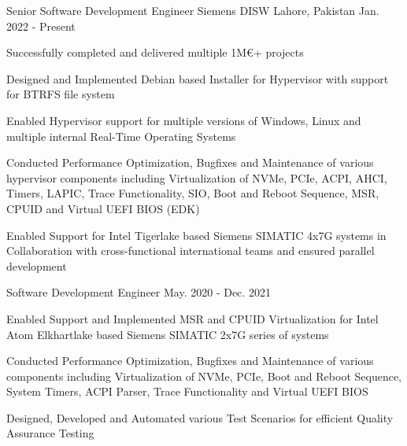 

\begin{cventries}

  \cventry
    {Senior Software Development Engineer} %
    {Siemens DISW} %
    {Lahore, Pakistan} %
    {Jan. 2022 - Present} %
    {
      \begin{cvitems} %
        \item Successfully completed and delivered multiple 1M€+ projects
        \item Designed and Implemented Debian based Installer for Hypervisor with support for BTRFS file system
        \item Enabled Hypervisor support for multiple versions of Windows, Linux and multiple internal Real-Time Operating Systems
        \item Conducted Performance Optimization, Bugfixes and Maintenance of various hypervisor components including Virtualization of NVMe, PCIe, ACPI, AHCI, Timers, LAPIC, Trace Functionality, SIO, Boot and Reboot Sequence, MSR, CPUID and Virtual UEFI BIOS (EDK)
        \item Enabled Support for Intel Tigerlake based Siemens SIMATIC 4x7G systems in Collaboration with cross-functional international teams and ensured parallel development
      \end{cvitems}
    }

  \cventry
    {Software Development Engineer} %
    {} %
    {} %
    {May. 2020 - Dec. 2021} %
    {
      \begin{cvitems} %
        \item Enabled Support and Implemented MSR and CPUID Virtualization for Intel Atom Elkhartlake based Siemens SIMATIC 2x7G series of systems
        \item Conducted Performance Optimization, Bugfixes and Maintenance of various components including Virtualization of NVMe, PCIe, Boot and Reboot Sequence, System Timers, ACPI Parser, Trace Functionality and Virtual UEFI BIOS
        \item Designed, Developed and Automated various Test Scenarios for efficient Quality Assurance Testing
      \end{cvitems}
    }


\end{cventries}
